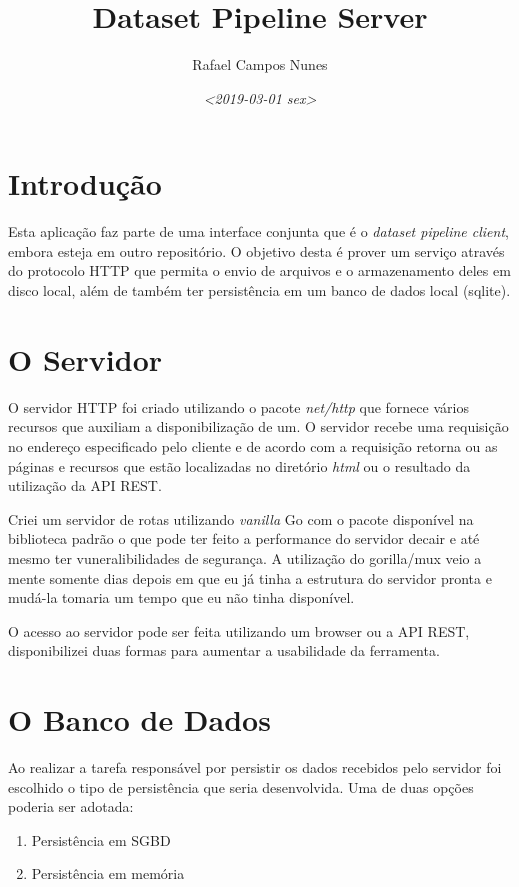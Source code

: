 \documentclass[a4paper, 12pt]{article}
\author{Rafael Campos Nunes}
\date{\textit{<2019-03-01 sex>}}
\title{Dataset Pipeline Server}
\begin{document}
\maketitle
\tableofcontents


\section{Introdução}
\label{sec:orga211026}

Esta aplicação faz parte de uma interface conjunta que é o \emph{dataset pipeline
client}, embora esteja em outro repositório. O objetivo desta é prover um
serviço através do protocolo HTTP que permita o envio de arquivos e o
armazenamento deles em disco local, além de também ter persistência em um banco
de dados local (sqlite).

\section{O Servidor}
\label{sec:org1ef9d94}

O servidor HTTP foi criado utilizando o pacote \emph{net/http} que fornece vários
recursos que auxiliam a disponibilização de um. O servidor recebe uma requisição
no endereço especificado pelo cliente e de acordo com a requisição retorna ou as
páginas e recursos que estão localizadas no diretório \emph{html} ou o resultado da
utilização da API REST.

Criei um servidor de rotas utilizando \emph{vanilla} Go com o pacote disponível na
biblioteca padrão o que pode ter feito a performance do servidor decair e até
mesmo ter vuneralibilidades de segurança. A utilização do gorilla/mux veio a
mente somente dias depois em que eu já tinha a estrutura do servidor pronta e
mudá-la tomaria um tempo que eu não tinha disponível.

O acesso ao servidor pode ser feita utilizando um browser ou a API REST,
disponibilizei duas formas para aumentar a usabilidade da ferramenta.

\section{O Banco de Dados}
\label{sec:org7874848}

Ao realizar a tarefa responsável por persistir os dados recebidos pelo servidor
foi escolhido o tipo de persistência que seria desenvolvida. Uma de duas opções
poderia ser adotada:

\begin{enumerate}
\item Persistência em SGBD
\item Persistência em memória
\end{enumerate}
\end{document}
